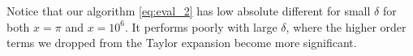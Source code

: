 \documentclass[10pt]{article}
\begin{document}
\begin{enumerate}
\begin{enumerate}
        Notice that our algorithm \eqref{eq:eval_2} has low absolute different for small \(\delta \) for both \(x=\pi\) and \(x=10^6\). It performs poorly with large \(\delta\), where the higher order terms we dropped from the Taylor expansion become more significant.
            
    \end{enumerate}

\end{enumerate}
\end{document}
